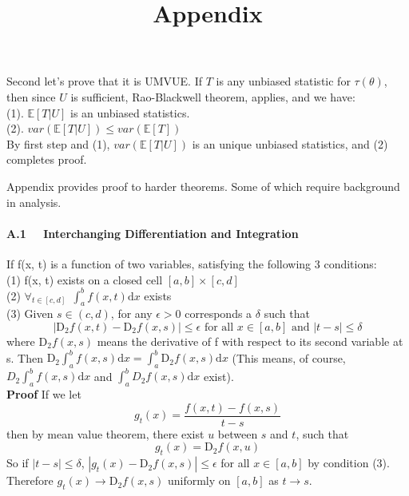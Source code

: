 \documentclass[a4paper,12pt]{article}
\begin{document}
Second let's prove that it is UMVUE. If $T$ is any unbiased statistic for $\tau(\theta)$, then since $U$ is sufficient, Rao-Blackwell theorem, applies, and we have:\\
(1). $\mathbb{E}[ T | U ]$ is an unbiased statistics.\\
(2). $var( \mathbb{E}[ T | U ] ) \leq var( \mathbb{E}[ T ] )$\\

By first step and (1), $var( \mathbb{E}[ T | U ] )$ is an unique unbiased statistics, and (2) completes proof.



















\newpage
\title{\textbf{{\LARGE Appendix\\}}}

Appendix provides proof to harder theorems. Some of which require background in analysis.\\


\paragraph{ A.1 \ \  Interchanging Differentiation and Integration}
If f(x, t) is a function of two variables, satisfying the following 3 conditions:\\
(1) f(x, t) exists on a closed cell $[a, b] \times [c, d]$\\
(2) $\forall_{t\in[c, d] }\ \ \int_a^b f(x, t) \mathrm{d}x$ exists\\
(3) Given $s \in (c, d)$, for any $\epsilon > 0$ corresponds a $\delta$ such that $$ | \mathrm{D}_2 f(x, t) - \mathrm{D}_2 f(x, s) | \leq \epsilon \text{ for all } x \in [a, b] \text{ and } | t - s | \leq \delta $$
where $\mathrm{D}_2 f(x, s)$ means the derivative of f with respect to its second variable at s.
Then $\mathrm{D}_2 \int_a^b f(x, s) \mathrm{d}x = \int_a^b \mathrm{D}_2 f(x, s) \mathrm{d}x$ (This means, of course, $D_2 \int_a^b f(x, s) \mathrm{d}x $ and $ \int_a^b D_2 f(x, s) \mathrm{d}x$ exist).\\

\textbf{Proof} If we let
$$g_t(x) = \frac{f(x, t)-f(x, s)}{t-s}$$
then by mean value theorem, there exist $u$ between $s$ and $t$, such that
$$g_t(x)= \mathrm{D}_2 f(x, u)$$
So if $|t-s|\leq\delta$, $ |g_t(x) - \mathrm{D}_2 f(x, s) | \leq \epsilon $ for all $x \in [a, b]$ by condition (3). Therefore $g_t(x)\to \mathrm{D}_2 f(x, s)$ uniformly on $[a, b]$ as $t\to s$.
\end{document}
